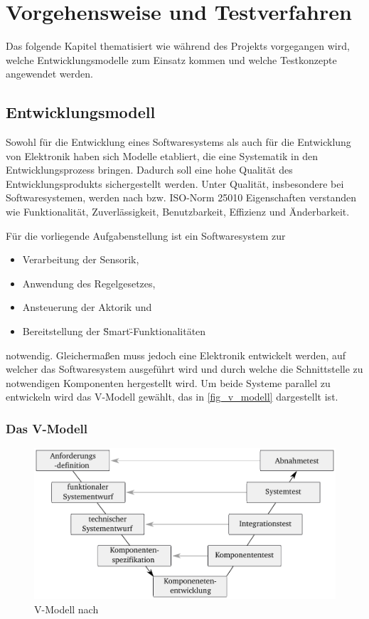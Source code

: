 \chapter{Vorgehensweise und Testverfahren}
Das folgende Kapitel thematisiert wie während des Projekts vorgegangen wird, welche Entwicklungsmodelle zum Einsatz kommen und welche Testkonzepte angewendet werden.

\section{Entwicklungsmodell}
Sowohl für die Entwicklung eines Softwaresystems als auch für die Entwicklung von Elektronik haben sich Modelle etabliert, die eine Systematik in den Entwicklungsprozess bringen. Dadurch soll eine hohe Qualität des Entwicklungsprodukts sichergestellt werden. 
Unter Qualität, insbesondere bei Softwaresystemen, werden nach \cite{BasSof} bzw. ISO-Norm 25010 \cite{ISO_25010} Eigenschaften verstanden wie Funktionalität, Zuverlässigkeit, Benutzbarkeit, Effizienz und Änderbarkeit.

Für die vorliegende Aufgabenstellung ist ein Softwaresystem zur
\begin{itemize}
	\item Verarbeitung der Sensorik,
	\item Anwendung des Regelgesetzes,
	\item Ansteuerung der Aktorik und
	\item Bereitstellung der \" Smart\" -Funktionalitäten
\end{itemize}
notwendig. Gleichermaßen muss jedoch eine Elektronik entwickelt werden, auf welcher das Softwaresystem ausgeführt wird und durch welche die Schnittstelle zu notwendigen Komponenten hergestellt wird. Um beide Systeme parallel zu entwickeln wird das V-Modell gewählt, das in \autoref{fig_v_modell} dargestellt ist. 



\subsection{Das V-Modell}

\begin{figure}%
\includegraphics[width=\columnwidth]{./Bilder/fig_v_modell}%
\caption{V-Modell nach \cite{Boehm 79}}%
\label{fig_v_modell}%
\end{figure}

